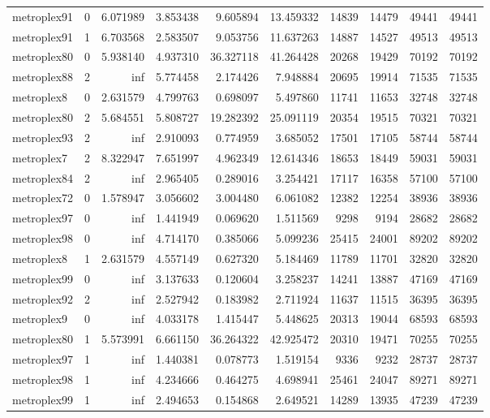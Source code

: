 \begin{longtable}{|l|r|r|r|r|r|r|r|r|r|}
metroplex91 & 0 & 6.071989 & 3.853438 & 9.605894 & 13.459332 & 14839 & 14479 & 49441 & 49441 \\
metroplex91 & 1 & 6.703568 & 2.583507 & 9.053756 & 11.637263 & 14887 & 14527 & 49513 & 49513 \\
metroplex80 & 0 & 5.938140 & 4.937310 & 36.327118 & 41.264428 & 20268 & 19429 & 70192 & 70192 \\
metroplex88 & 2 & inf & 5.774458 & 2.174426 & 7.948884 & 20695 & 19914 & 71535 & 71535 \\
metroplex8 & 0 & 2.631579 & 4.799763 & 0.698097 & 5.497860 & 11741 & 11653 & 32748 & 32748 \\
metroplex80 & 2 & 5.684551 & 5.808727 & 19.282392 & 25.091119 & 20354 & 19515 & 70321 & 70321 \\
metroplex93 & 2 & inf & 2.910093 & 0.774959 & 3.685052 & 17501 & 17105 & 58744 & 58744 \\
metroplex7 & 2 & 8.322947 & 7.651997 & 4.962349 & 12.614346 & 18653 & 18449 & 59031 & 59031 \\
metroplex84 & 2 & inf & 2.965405 & 0.289016 & 3.254421 & 17117 & 16358 & 57100 & 57100 \\
metroplex72 & 0 & 1.578947 & 3.056602 & 3.004480 & 6.061082 & 12382 & 12254 & 38936 & 38936 \\
metroplex97 & 0 & inf & 1.441949 & 0.069620 & 1.511569 & 9298 & 9194 & 28682 & 28682 \\
metroplex98 & 0 & inf & 4.714170 & 0.385066 & 5.099236 & 25415 & 24001 & 89202 & 89202 \\
metroplex8 & 1 & 2.631579 & 4.557149 & 0.627320 & 5.184469 & 11789 & 11701 & 32820 & 32820 \\
metroplex99 & 0 & inf & 3.137633 & 0.120604 & 3.258237 & 14241 & 13887 & 47169 & 47169 \\
metroplex92 & 2 & inf & 2.527942 & 0.183982 & 2.711924 & 11637 & 11515 & 36395 & 36395 \\
metroplex9 & 0 & inf & 4.033178 & 1.415447 & 5.448625 & 20313 & 19044 & 68593 & 68593 \\
metroplex80 & 1 & 5.573991 & 6.661150 & 36.264322 & 42.925472 & 20310 & 19471 & 70255 & 70255 \\
metroplex97 & 1 & inf & 1.440381 & 0.078773 & 1.519154 & 9336 & 9232 & 28737 & 28737 \\
metroplex98 & 1 & inf & 4.234666 & 0.464275 & 4.698941 & 25461 & 24047 & 89271 & 89271 \\
metroplex99 & 1 & inf & 2.494653 & 0.154868 & 2.649521 & 14289 & 13935 & 47239 & 47239 \\

\end{longtable}
